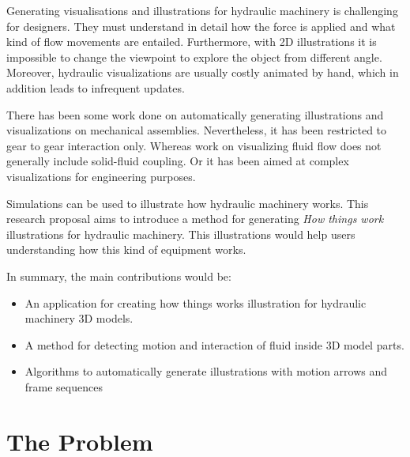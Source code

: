 \documentclass[11pt]{report}
\begin{document}
Generating visualisations and illustrations for hydraulic machinery is challenging for designers.
They must understand in detail how the force is applied and what kind of flow movements are entailed.
Furthermore, with 2D illustrations it is impossible to change the viewpoint to explore the object from different angle.
Moreover, hydraulic visualizations are usually costly animated by hand, which in addition leads to infrequent updates.

There has been some work done on automatically generating illustrations and visualizations on mechanical assemblies.
Nevertheless, it has been restricted to gear to gear interaction only.
Whereas work on visualizing fluid flow does not generally include solid-fluid coupling.
Or it has been aimed at complex visualizations for engineering purposes.

Simulations can be used to illustrate how hydraulic machinery works.
This research proposal aims to introduce a method for generating \textit{How things work} illustrations for hydraulic machinery.
This illustrations would help users understanding how this kind of equipment works.

In summary, the main contributions would be:
\begin{itemize}
\item An application for creating how things works illustration for hydraulic machinery 3D models.
\item A method for detecting motion and interaction of fluid inside 3D model parts.
\item Algorithms to automatically generate illustrations with motion arrows and frame sequences
\end{itemize}


\section{The Problem}
\label{sec:problem}
\end{document}
